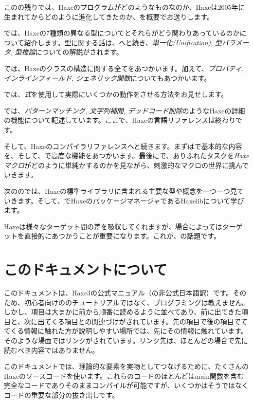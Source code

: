 このの残りでは、Haxeのプログラムがどのようなものなのか、Haxeは2005年に生まれてからどのように進化してきたのか、を概要でお送りします。

では、Haxeの7種類の異なる型についてとそれらがどう関わりあっているのかについて紹介します。型に関する話は、へと続き、\emph{単一化(Unification)}, \emph{型パラメータ}, \emph{型推論}についての解説がされます。

では、Haxeのクラスの構造に関する全てをあつかいます。加えて、\emph{プロパティ}, \emph{インラインフィールド}, \emph{ジェネリック関数}についてもあつかいます。

では、\emph{式}を使用して実際にいくつかの動作をさせる方法をお見せします。

では、\emph{パターンマッチング}, \emph{文字列補間}, \emph{デッドコード削除}のようなHaxeの詳細の機能について記述しています。ここで、Haxeの言語リファレンスは終わりです。

そして、Haxeのコンパイラリファレンスへと続きます。まずはで基本的な内容を、そして、で高度な機能をあつかいます。最後にで、ありふれたタスクを\emph{Haxeマクロ}がどのように単純かするのかを見ながら、刺激的なマクロの世界に挑んでいきます。

次ののでは、Haxeの標準ライブラリに含まれる主要な型や概念を一つ一つ見ていきます。そして、でHaxeのパッケージマネージャであるHaxelibについて学びます。

Haxeは様々なターゲット間の差を吸収してくれますが、場合によってはターゲットを直接的にあつかうことが重要になります。これが、の話題です。

\section{このドキュメントについて}
\label{introduction-about-this-document}

このドキュメントは、Haxe3の公式マニュアル（の非公式日本語訳）です。そのため、初心者向けののチュートリアルではなく、プログラミングは教えません。しかし、項目は大まかに前から順番に読めるように並べてあり、前に出てきた項目と、次に出てくる項目との関連づけがされています。先の項目で後の項目でててくる情報に触れた方が説明しやすい場所では、先にその情報に触れています。そのような場面ではリンクがされています。リンク先は、ほとんどの場合で先に読むべき内容ではありません。

このドキュメントでは、理論的な要素を実物としてつなげるために、たくさんのHaxeのソースコードを使います。これらのコードのほとんどはmain関数を含む完全なコードでありそのままコンパイルが可能ですが、いくつかはそうではなくコードの重要な部分の抜き出しです。

